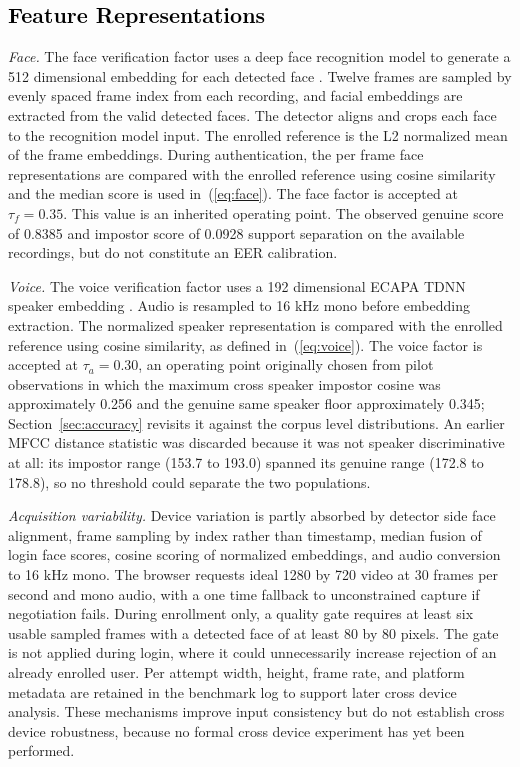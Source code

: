 \documentclass[runningheads]{llncs}
\begin{document}
{{\subsection{\textcolor{black}{Feature Representations}}\label{sec:features}
\emph{Face.} The face verification factor uses a deep face recognition model to generate a 512 dimensional embedding for each detected face \cite{arcface}. Twelve frames are sampled by evenly spaced frame index from each recording, and facial embeddings are extracted from the valid detected faces. The detector aligns and crops each face to the recognition model input. The enrolled reference is the L2 normalized mean of the frame embeddings. During authentication, the per frame face representations are compared with the enrolled reference using cosine similarity and the median score is used in~(\ref{eq:face}). The face factor is accepted at $\tau_f=0.35$. This value is an inherited operating point. The observed genuine score of 0.8385 and impostor score of 0.0928 support separation on the available recordings, but do not constitute an EER calibration.

\emph{Voice.} The voice verification factor uses a 192 dimensional ECAPA TDNN speaker embedding \cite{ecapa}. Audio is resampled to 16 kHz mono before embedding extraction. The normalized speaker representation is compared with the enrolled reference using cosine similarity, as defined in~(\ref{eq:voice}). The voice factor is accepted at $\tau_a=0.30$, an operating point originally chosen from pilot observations in which the maximum cross speaker impostor cosine was approximately 0.256 and the genuine same speaker floor approximately 0.345; Section~\ref{sec:accuracy} revisits it against the corpus level distributions. An earlier MFCC distance statistic was discarded because it was not speaker discriminative at all: its impostor range (153.7 to 193.0) spanned its genuine range (172.8 to 178.8), so no threshold could separate the two populations.

\emph{Acquisition variability.} Device variation is partly absorbed by detector side face alignment, frame sampling by index rather than timestamp, median fusion of login face scores, cosine scoring of normalized embeddings, and audio conversion to 16 kHz mono. The browser requests ideal 1280 by 720 video at 30 frames per second and mono audio, with a one time fallback to unconstrained capture if negotiation fails. During enrollment only, a quality gate requires at least six usable sampled frames with a detected face of at least 80 by 80 pixels. The gate is not applied during login, where it could unnecessarily increase rejection of an already enrolled user. Per attempt width, height, frame rate, and platform metadata are retained in the benchmark log to support later cross device analysis. These mechanisms improve input consistency but do not establish cross device robustness, because no formal cross device experiment has yet been performed.

}}
\end{document}
